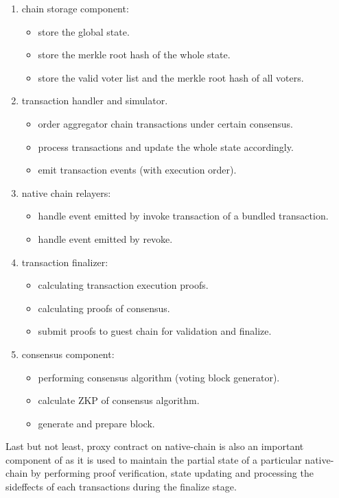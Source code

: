 \documentclass[pageno]{jpaper}
\begin{document}
\begin{enumerate}[leftmargin=*]
\item chain storage component:
    \begin{itemize}
    \item store the global state.
    \item store the merkle root hash of the whole state.
    \item store the valid voter list and the merkle root hash of all voters.
    \end{itemize}
\item transaction handler and simulator.
    \begin{itemize}
    \item order aggregator chain transactions under certain consensus.
    \item process transactions and update the whole state accordingly.
    \item emit transaction events (with execution order).
    \end{itemize}
\item native chain relayers:
    \begin{itemize}
    \item handle event emitted by invoke transaction of a bundled transaction.
    \item handle event emitted by revoke.
    \end{itemize}
\item transaction finalizer:
    \begin{itemize}
    \item calculating transaction execution proofs.
    \item calculating proofs of consensus.
    \item submit proofs to guest chain for validation and finalize.
    \end{itemize}
\item consensus component:
    \begin{itemize}
    \item performing consensus algorithm (voting block generator).
    \item calculate ZKP of consensus algorithm.
    \item generate and prepare block.
    \end{itemize}
\end{enumerate}

Last but not least, proxy contract on native-chain is also an important component of \dprotocol as it is used to maintain the partial state of a particular native-chain by performing proof verification, state updating and processing the sideffects of each transactions during the finalize stage.  
\end{document}
